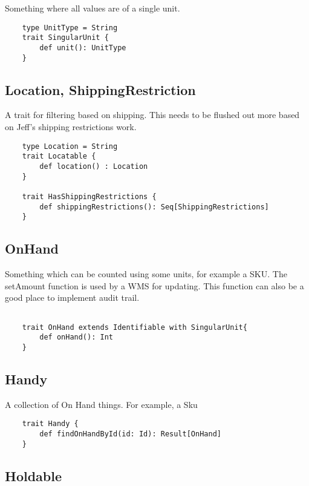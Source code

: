 \documentclass[11pt]{article}
\begin{document}
Something where all values are of a single unit.

\begin{lstlisting}
    type UnitType = String
    trait SingularUnit {
        def unit(): UnitType
    }
\end{lstlisting}

\subsection{Location, ShippingRestriction}

A trait for filtering based on shipping. This needs to be flushed out more based on
Jeff's shipping restrictions work.

\begin{lstlisting}
    type Location = String
    trait Locatable {
        def location() : Location
    }

    trait HasShippingRestrictions {
        def shippingRestrictions(): Seq[ShippingRestrictions]
    }

\end{lstlisting}

\subsection{OnHand}

Something which can be counted using some units, for example a SKU. 
The setAmount function is used by a WMS for updating. This function
can also be a good place to implement audit trail.

\begin{lstlisting}

    trait OnHand extends Identifiable with SingularUnit{ 
        def onHand(): Int
    }
\end{lstlisting}


\subsection{Handy}

A collection of On Hand things. For example, a Sku

\begin{lstlisting}
    trait Handy {
        def findOnHandById(id: Id): Result[OnHand]
    }
\end{lstlisting}

\subsection{Holdable}
\end{document}
